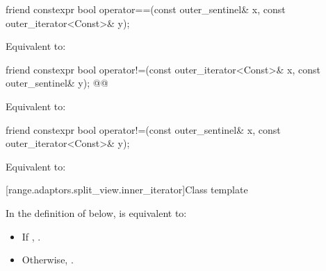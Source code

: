 {\color{oldclr}
%
\begin{itemdecl}
friend constexpr bool operator==(const outer_sentinel& x, const outer_iterator<Const>& y);
\end{itemdecl}

\begin{itemdescr}
\pnum
\effects Equivalent to: 
\end{itemdescr}
} %

%
\begin{itemdecl}
friend constexpr bool operator!=(const outer_iterator<Const>& x, const outer_sentinel& y);
@@
\end{itemdecl}

\begin{itemdescr}
\pnum
\effects Equivalent to: 
\end{itemdescr}

{\color{oldclr}
%
\begin{itemdecl}
friend constexpr bool operator!=(const outer_sentinel& x, const outer_iterator<Const>& y);
\end{itemdecl}

\begin{itemdescr}
\pnum
\effects Equivalent to: 
\end{itemdescr}
} %

[range.adaptors.split_view.inner_iterator]{Class template }

\pnum
\begin{note}
\end{note}

{\color{oldclr}
\pnum
In the definition of  below,
 is equivalent to:
\begin{itemize}
\item If    , .

\item Otherwise, .
\end{itemize}
} %


